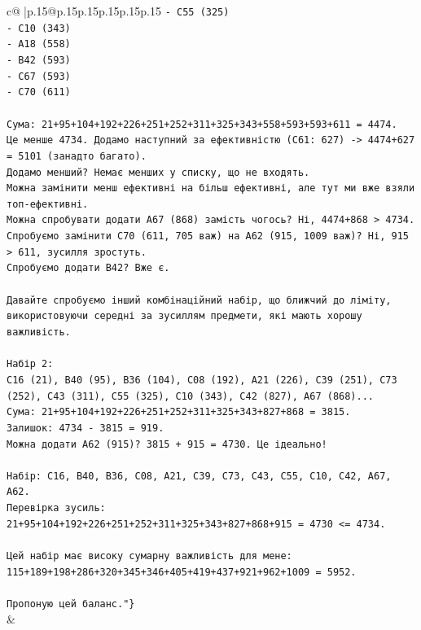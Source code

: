 \documentclass{article}
\begin{document}
{\begin{supertabular}{c@{$\;$}|p{.15\linewidth}@{}p{.15\linewidth}p{.15\linewidth}p{.15\linewidth}p{.15\linewidth}p{.15\linewidth}}
{{{\texttt{{-} C55 (325)} \\
\texttt{{-} C10 (343)} \\
\texttt{{-} A18 (558)} \\
\texttt{{-} B42 (593)} \\
\texttt{{-} C67 (593)} \\
\texttt{{-} C70 (611)} \\
\\ 
\texttt{Сума: 21+95+104+192+226+251+252+311+325+343+558+593+593+611 = 4474.} \\
\texttt{Це менше 4734. Додамо наступний за ефективністю (C61: 627) {-}> 4474+627 = 5101 (занадто багато).} \\
\texttt{Додамо менший? Немає менших у списку, що не входять.} \\
\texttt{Можна замінити менш ефективні на більш ефективні, але тут ми вже взяли топ{-}ефективні.} \\
\texttt{Можна спробувати додати A67 (868) замість чогось? Ні, 4474+868 > 4734.} \\
\texttt{Спробуємо замінити C70 (611, 705 важ) на A62 (915, 1009 важ)? Ні, 915 > 611, зусилля зростуть.} \\
\texttt{Спробуємо додати B42? Вже є.} \\
\\ 
\texttt{Давайте спробуємо інший комбінаційний набір, що ближчий до ліміту, використовуючи середні за зусиллям предмети, які мають хорошу важливість.} \\
\\ 
\texttt{Набір 2:} \\
\texttt{C16 (21), B40 (95), B36 (104), C08 (192), A21 (226), C39 (251), C73 (252), C43 (311), C55 (325), C10 (343), C42 (827), A67 (868)...} \\
\texttt{Сума: 21+95+104+192+226+251+252+311+325+343+827+868 = 3815.} \\
\texttt{Залишок: 4734 {-} 3815 = 919.} \\
\texttt{Можна додати A62 (915)? 3815 + 915 = 4730. Це ідеально!} \\
\\ 
\texttt{Набір: C16, B40, B36, C08, A21, C39, C73, C43, C55, C10, C42, A67, A62.} \\
\texttt{Перевірка зусиль:} \\
\texttt{21+95+104+192+226+251+252+311+325+343+827+868+915 = 4730 <= 4734.} \\
\\ 
\texttt{Цей набір має високу сумарну важливість для мене:} \\
\texttt{115+189+198+286+320+345+346+405+419+437+921+962+1009 = 5952.} \\
\\ 
\texttt{Пропоную цей баланс."\}} \\
            }
        }
    }
    & \\ \\


\end{supertabular}}
\end{document}

